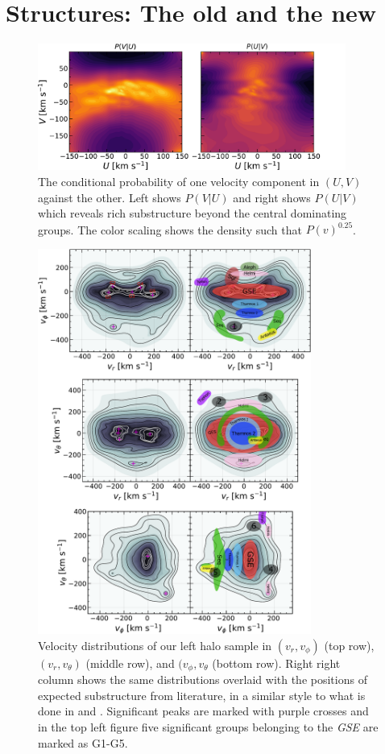 \section{Structures: The old and the new}\label{sec:p3-structures}
\begin{figure}[t!]
    \centering
    \includegraphics[width=0.9\textwidth]{images/conditional_snbh.pdf}
    \caption{The conditional probability of one velocity component in $(U, V)$ against the other. Left shows $P(V|U)$ and right shows $P(U|V)$ which reveals rich substructure beyond the central dominating groups. The color scaling shows the density such that $P(v)^{0.25}$.} %
    \label{fig:cond_snbh}
\end{figure}
\begin{figure}[t!]
    \centering
    \includegraphics[width=0.8\textwidth]{images/halo_fv.pdf}
    \caption{Velocity distributions of our left halo sample in $(v_r, v_\phi)$ (top row), $(v_r, v_\theta)$ (middle row), and $(v_\phi, v_\theta$ (bottom row). Right right column shows the same distributions overlaid with the positions of expected substructure from literature, in a similar style to what is done in \cite{naidu:20} and \cite{mardini:2022}. Significant peaks are marked with purple crosses and in the top left figure five significant groups belonging to the \textit{GSE} are marked as G1-G5.} %
    \label{fig:halo_fv}
\end{figure}

